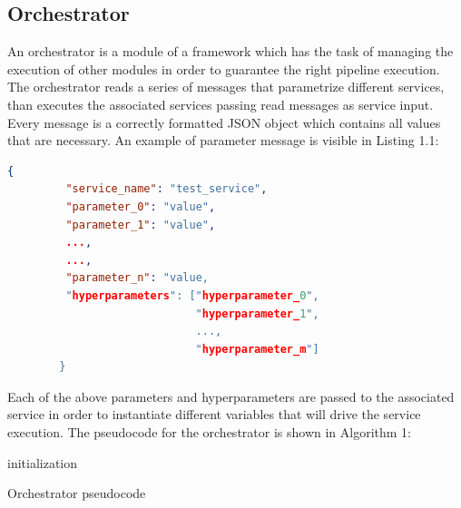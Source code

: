 \documentclass[\main/main.tex]{subfiles}
\begin{document}
\subsection{Orchestrator}
An orchestrator is a module of a framework which has the task of managing the execution of other modules in order to guarantee the right pipeline execution. The orchestrator reads a series of messages that parametrize different services, than executes the associated services passing read messages as service input. Every message is a correctly formatted JSON object which contains all values that are necessary. An example of parameter message is visible in Listing 1.1:
\\
\begin{center}
    \begin{lstlisting}[language=json, caption="Parameter message example", captionpos=b]
        {
         "service_name": "test_service",
         "parameter_0": "value",
         "parameter_1": "value",
         ...,
         ...,
         "parameter_n": "value,
         "hyperparameters": ["hyperparameter_0", 
                             "hyperparameter_1", 
                             ..., 
                             "hyperparameter_m"]
        }
    \end{lstlisting}
    \label{json_message}
\end{center}

Each of the above parameters and hyperparameters are passed to the associated service in order to instantiate different variables that will drive the service execution.
The pseudocode for the orchestrator is shown in Algorithm 1:
\begin{center}
    \begin{algorithm}[H]
     initialization\;
     \caption{Orchestrator pseudocode}
    \end{algorithm}
\end{center}
\end{document}
